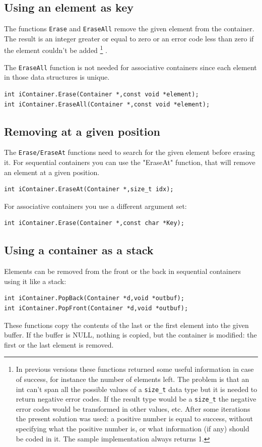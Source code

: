 \documentclass[12pt,a4paper,openany]{memoir} %
\begin{document}
\subsection{Using an element as key}
The functions \texttt{Erase} and \texttt{EraseAll} remove the given element from the container. 
The result is an integer greater or equal to zero or an error code less than zero if the element couldn't be added
\footnote{In previous versions these functions returned some useful information in case of success, for instance the number of elements left. The problem is that an int can't span all the possible values of a \texttt{size\_t} data type but it is needed to return negative
error codes. If the result type would be a \texttt{size\_t} the negative error codes would be transformed in other values, etc. After some iterations 
the present solution was used: a positive number is equal to success, without specifying what the positive number is, or what information (if any) 
should be coded in it. The sample implementation always returns 1.} 
.

The \texttt{EraseAll} function is not needed for associative containers since each element in those data structures is unique.
\begin{verbatim}
int iContainer.Erase(Container *,const void *element);
int iContainer.EraseAll(Container *,const void *element);
\end{verbatim}
\subsection{Removing at a given position}
\noindent The \texttt{Erase/EraseAt} functions need to search for the given element before erasing it. For sequential containers you can use the "EraseAt" function, that will remove an element at a given position.
\begin{verbatim}
int iContainer.EraseAt(Container *,size_t idx);
\end{verbatim}
\noindent
For associative containers you use a different argument set:
\begin{verbatim}
int iContainer.Erase(Container *,const char *Key);
\end{verbatim}
\subsection{Using a container as a stack}
Elements can be removed from the front or the back in sequential containers using it like a stack:
\begin{verbatim}
int iContainer.PopBack(Container *d,void *outbuf);
int iContainer.PopFront(Container *d,void *outbuf);
\end{verbatim}
These functions copy the contents of the last or the first element into the given buffer. If the buffer is NULL, nothing is copied, but the
container is modified: the first or the last element is removed.
\end{document}
